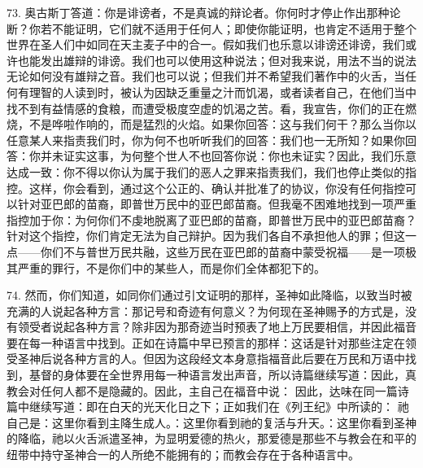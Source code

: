 73. 奥古斯丁答道：你是诽谤者，不是真诚的辩论者。你何时才停止作出那种论断？你若不能证明，它们就不适用于任何人；即使你能证明，也肯定不适用于整个世界在圣人们中如同在天主麦子中的合一。假如我们也乐意以诽谤还诽谤，我们或许也能发出雄辩的诽谤。我们也可以使用这种说法；但对我来说，用法不当的说法无论如何没有雄辩之音。我们也可以说；但我们并不希望我们著作中的火舌，当任何有理智的人读到时，被认为因缺乏重量之汁而饥渴，或者读者自己，在他们当中找不到有益情感的食粮，而遭受极度空虚的饥渴之苦。看，我宣告，你们的正在燃烧，不是哗啦作响的，而是猛烈的火焰。如果你回答：这与我们何干？那么当你以任意某人来指责我们时，你为何不也听听我们的回答：我们也一无所知？如果你回答：你并未证实这事，为何整个世人不也回答你说：你也未证实？因此，我们乐意达成一致：你不得以你认为属于我们的恶人之罪来指责我们，我们也停止类似的指控。这样，你会看到，通过这个公正的、确认并批准了的协议，你没有任何指控可以针对亚巴郎的苗裔，即普世万民中的亚巴郎苗裔。但我毫不困难地找到一项严重指控加于你：为何你们不虔地脱离了亚巴郎的苗裔，即普世万民中的亚巴郎苗裔？针对这个指控，你们肯定无法为自己辩护。因为我们各自不承担他人的罪；但这一点——你们不与普世万民共融，这些万民在亚巴郎的苗裔中蒙受祝福——是一项极其严重的罪行，不是你们中的某些人，而是你们全体都犯下的。\par

74. 然而，你们知道，如同你们通过引文证明的那样，圣神如此降临，以致当时被充满的人说起各种方言：那记号和奇迹有何意义？为何现在圣神赐予的方式是，没有领受者说起各种方言？除非因为那奇迹当时预表了地上万民要相信，并因此福音要在每一种语言中找到。正如在诗篇中早已预言的那样：这话是针对那些注定在领受圣神后说各种方言的人。但因为这段经文本身意指福音此后要在万民和万语中找到，基督的身体要在全世界用每一种语言发出声音，所以诗篇继续写道：因此，真教会对任何人都不是隐藏的。因此，主自己在福音中说： 因此，达味在同一篇诗篇中继续写道：即在白天的光天化日之下；正如我们在《列王纪》中所读的： 祂自己是：这里你看到主降生成人。：这里你看到祂的复活与升天。：这里你看到圣神的降临，祂以火舌派遣圣神，为显明爱德的热火，那爱德是那些不与教会在和平的纽带中持守圣神合一的人所绝不能拥有的；而教会存在于各种语言中。\par

